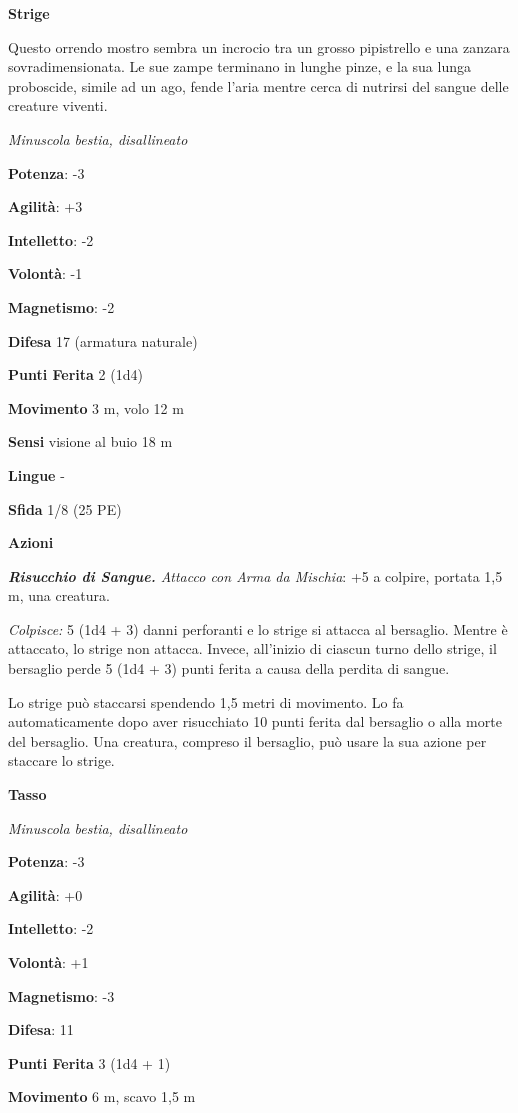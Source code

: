 \begin{multicols}{2}
\textbf{Strige}

Questo orrendo mostro sembra un incrocio tra un grosso pipistrello e una
zanzara sovradimensionata. Le sue zampe terminano in lunghe pinze, e la
sua lunga proboscide, simile ad un ago, fende l'aria mentre cerca di
nutrirsi del sangue delle creature viventi.

\emph{Minuscola bestia, disallineato}

\textbf{Potenza}: -3

\textbf{Agilità}: +3

\textbf{Intelletto}: -2

\textbf{Volontà}: -1

\textbf{Magnetismo}: -2

\textbf{Difesa} 17 (armatura naturale)

\textbf{Punti Ferita} 2 (1d4)

\textbf{Movimento} 3 m, volo 12 m

\textbf{Sensi} visione al buio 18 m

\textbf{Lingue} -

\textbf{Sfida} 1/8 (25 PE)

\textbf{Azioni}

\emph{\textbf{Risucchio di Sangue.} Attacco con Arma da Mischia}: +5 a
colpire, portata 1,5 m, una creatura.

\emph{Colpisce:} 5 (1d4 + 3) danni perforanti e lo strige si attacca al
bersaglio. Mentre è attaccato, lo strige non attacca. Invece, all'inizio
di ciascun turno dello strige, il bersaglio perde 5 (1d4 + 3) punti
ferita a causa della perdita di sangue.

Lo strige può staccarsi spendendo 1,5 metri di movimento. Lo fa
automaticamente dopo aver risucchiato 10 punti ferita dal bersaglio o
alla morte del bersaglio. Una creatura, compreso il bersaglio, può usare
la sua azione per staccare lo strige.

\textbf{Tasso}

\emph{Minuscola bestia, disallineato}

\textbf{Potenza}: -3

\textbf{Agilità}: +0

\textbf{Intelletto}: -2

\textbf{Volontà}: +1

\textbf{Magnetismo}: -3

\textbf{Difesa}: 11

\textbf{Punti Ferita} 3 (1d4 + 1)

\textbf{Movimento} 6 m, scavo 1,5 m


\end{multicols}
